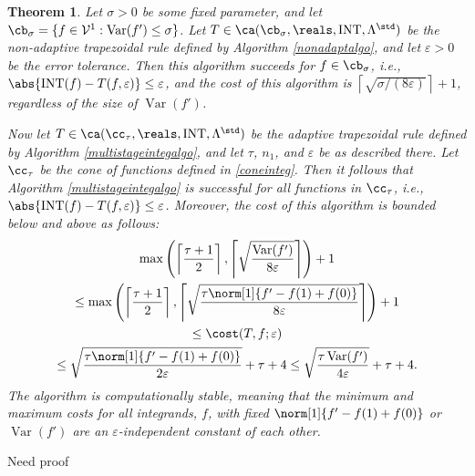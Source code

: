 \documentclass{iitthesis}
\DeclareMathOperator{\Var}{Var}
\DeclareMathOperator{\INT}{INT}
\newtheorem{theorem}{Theorem}
\theoremstyle{definition}
\theoremstyle{remark}
\begin{document}
\begin{theorem} \label{multistageintegthm}
Let $\sigma >0$ be some fixed parameter, and let $\cb_{\sigma}=\{f \in  \mathcal{V}^{1} : \Var(f')\leq \sigma\}$. Let $T \in \ca(\cb_{\sigma}, \reals, \INT, \Lambda^{\std})$ be the non-adaptive trapezoidal rule defined by Algorithm \ref{nonadaptalgo}, and let $\varepsilon>0$ be the error tolerance. Then this algorithm succeeds for $f \in \cb_{\sigma}$, i.e., $\abs{\INT(f) - T(f,\varepsilon)} \le \varepsilon$, and the cost of this algorithm is $\left \lceil \sqrt{\sigma/(8\varepsilon)}\right \rceil + 1$, regardless of the size of $\Var(f')$.

Now let $T \in \ca(\cc_{\tau}, \reals, \INT, \Lambda^{\std})$ be the adaptive trapezoidal rule defined by Algorithm \ref{multistageintegalgo}, and let $\tau$, $n_1$, and $\varepsilon$ be as described there. Let $\cc_\tau$ be the cone of functions defined in \eqref{coneinteg}.  Then it follows that Algorithm \ref{multistageintegalgo} is successful for all functions in $\cc_{\tau}$,  i.e.,  $\abs{\INT(f) - T(f,\varepsilon)} \le \varepsilon$.  Moreover, the cost of this algorithm is bounded below and above as follows:
\begin{multline}
\max \left(\left \lceil\frac{\tau+1}{2} \right \rceil, \left \lceil \sqrt{\frac{ \Var(f')}{8\varepsilon}} \right \rceil \right) +1 \\
\le \max \left(\left \lceil\frac{\tau+1}{2} \right \rceil, \left \lceil \sqrt{\frac{\tau \norm[1]{f'-f(1)+f(0)}}{8\varepsilon}} \right \rceil \right) +1 \\
\le
\cost(T,f;\varepsilon) \\
\le \sqrt{\frac{\tau \norm[1]{f'-f(1)+f(0)}}{2\varepsilon}} + \tau + 4
\le \sqrt{\frac{\tau \Var(f') }{4\varepsilon}} + \tau + 4.
\end{multline}
The algorithm is computationally stable, meaning that the minimum and maximum costs for all integrands, $f$, with fixed $\norm[1]{f'-f(1)+f(0)}$ or $\Var(f')$ are an $\varepsilon$-independent constant of each other.
\end{theorem}

 Need proof


\end{document}
